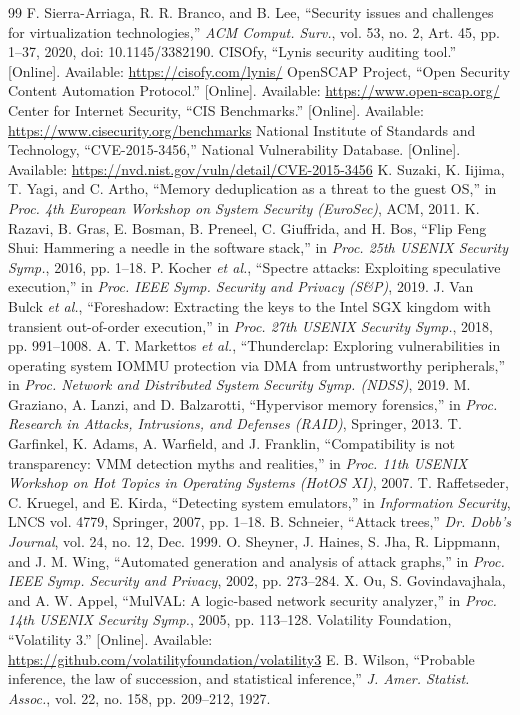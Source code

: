 \documentclass[conference]{IEEEtran}
\begin{document}
\balance
\begin{thebibliography}{99}
 F. Sierra-Arriaga, R. R. Branco, and B. Lee, ``Security issues and challenges for virtualization technologies,'' \emph{ACM Comput. Surv.}, vol. 53, no. 2, Art. 45, pp. 1--37, 2020, doi: 10.1145/3382190.
 CISOfy, ``Lynis security auditing tool.'' [Online]. Available: \url{https://cisofy.com/lynis/}
 OpenSCAP Project, ``Open Security Content Automation Protocol.'' [Online]. Available: \url{https://www.open-scap.org/}
 Center for Internet Security, ``CIS Benchmarks.'' [Online]. Available: \url{https://www.cisecurity.org/benchmarks}
 National Institute of Standards and Technology, ``CVE-2015-3456,'' National Vulnerability Database. [Online]. Available: \url{https://nvd.nist.gov/vuln/detail/CVE-2015-3456}
 K. Suzaki, K. Iijima, T. Yagi, and C. Artho, ``Memory deduplication as a threat to the guest OS,'' in \emph{Proc. 4th European Workshop on System Security (EuroSec)}, ACM, 2011.
 K. Razavi, B. Gras, E. Bosman, B. Preneel, C. Giuffrida, and H. Bos, ``Flip Feng Shui: Hammering a needle in the software stack,'' in \emph{Proc. 25th USENIX Security Symp.}, 2016, pp. 1--18.
 P. Kocher \emph{et al.}, ``Spectre attacks: Exploiting speculative execution,'' in \emph{Proc. IEEE Symp. Security and Privacy (S\&P)}, 2019.
 J. Van Bulck \emph{et al.}, ``Foreshadow: Extracting the keys to the Intel SGX kingdom with transient out-of-order execution,'' in \emph{Proc. 27th USENIX Security Symp.}, 2018, pp. 991--1008.
 A. T. Markettos \emph{et al.}, ``Thunderclap: Exploring vulnerabilities in operating system IOMMU protection via DMA from untrustworthy peripherals,'' in \emph{Proc. Network and Distributed System Security Symp. (NDSS)}, 2019.
 M. Graziano, A. Lanzi, and D. Balzarotti, ``Hypervisor memory forensics,'' in \emph{Proc. Research in Attacks, Intrusions, and Defenses (RAID)}, Springer, 2013.
 T. Garfinkel, K. Adams, A. Warfield, and J. Franklin, ``Compatibility is not transparency: VMM detection myths and realities,'' in \emph{Proc. 11th USENIX Workshop on Hot Topics in Operating Systems (HotOS XI)}, 2007.
 T. Raffetseder, C. Kruegel, and E. Kirda, ``Detecting system emulators,'' in \emph{Information Security}, LNCS vol. 4779, Springer, 2007, pp. 1--18.
 B. Schneier, ``Attack trees,'' \emph{Dr. Dobb's Journal}, vol. 24, no. 12, Dec. 1999.
 O. Sheyner, J. Haines, S. Jha, R. Lippmann, and J. M. Wing, ``Automated generation and analysis of attack graphs,'' in \emph{Proc. IEEE Symp. Security and Privacy}, 2002, pp. 273--284.
 X. Ou, S. Govindavajhala, and A. W. Appel, ``MulVAL: A logic-based network security analyzer,'' in \emph{Proc. 14th USENIX Security Symp.}, 2005, pp. 113--128.
 Volatility Foundation, ``Volatility 3.'' [Online]. Available: \url{https://github.com/volatilityfoundation/volatility3}
 E. B. Wilson, ``Probable inference, the law of succession, and statistical inference,'' \emph{J. Amer. Statist. Assoc.}, vol. 22, no. 158, pp. 209--212, 1927.
\end{thebibliography}
\end{document}
